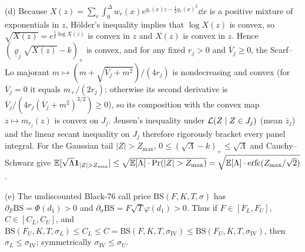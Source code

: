(d) Because $X(z)=\sum_r\int_0^\Delta w_r(x)e^{g_r(x)z-\frac12 g_r(x)^2}\dd x$ is a positive mixture of
exponentials in $z$, H\"older's inequality implies that $\log X(z)$ is convex, so $\sqrt{X(z)}=e^{\frac12\log X(z)}$
is convex in $z$ and $X(z)$ is convex in $z$. Hence $(\underline{\varrho}_j\sqrt{X(z)}-k)_+$ is convex, and
for any fixed $r_j>0$ and $\overline{V}_j\ge0$, the Scarf--Lo majorant
$m\mapsto(m+\sqrt{\overline{V}_j+m^2})/(4r_j)$ is nondecreasing and convex (for $\overline V_j=0$ it equals $m_+/(2r_j)$; otherwise its second derivative is
$\overline{V}_j/(4r_j(\overline{V}_j+m^2)^{3/2})\ge0$), so its composition with the convex map
$z\mapsto m_{r_j}(z)$ is convex on $J_j$. Jensen's inequality under $\mathcal{L}(Z\mid Z\in J_j)$ (mean $\bar z_j$)
and the linear secant inequality on $J_j$ therefore rigorously bracket every panel integral. For the
Gaussian tail $|Z|>Z_{\max}$, $0\le(\sqrt{\Lambda}-k)_+\le\sqrt{\Lambda}$ and Cauchy--Schwarz give
$\E[\sqrt{\Lambda}\mathbf{1}_{|Z|>Z_{\max}}]\le\sqrt{\E[\Lambda]\cdot\Pr(|Z|>Z_{\max})}
=\sqrt{\E[\Lambda]\cdot\operatorname{erfc}(Z_{\max}/\sqrt{2})}$.

(e) The undiscounted Black-76 call price $\mathrm{BS}(F,K,T,\sigma)$ has $\partial_F\mathrm{BS}=\Phi(d_1)>0$
and $\partial_\sigma\mathrm{BS}=F\sqrt{T}\varphi(d_1)>0$. Thus if $F\in[F_L,F_U]$, $C\in[C_L,C_U]$, and
$\mathrm{BS}(F_U,K,T,\sigma_L)\le C_L\le C=\mathrm{BS}(F,K,T,\sigma_{\mathrm{IV}})\le\mathrm{BS}(F_U,K,T,\sigma_{\mathrm{IV}})$,
then $\sigma_L\le\sigma_{\mathrm{IV}}$; symmetrically $\sigma_{\mathrm{IV}}\le\sigma_U$.
